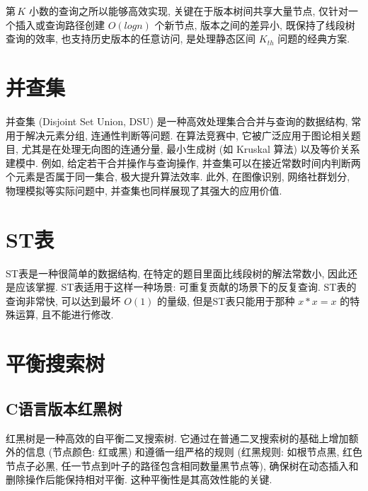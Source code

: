 \documentclass[a4paper]{ctexbook}
\begin{document}
第 $K$ 小数的查询之所以能够高效实现, 关键在于版本树间共享大量节点, 仅针对一个插入或查询路径创建 $O(log n)$ 个新节点, 版本之间的差异小, 既保持了线段树查询的效率, 也支持历史版本的任意访问, 是处理静态区间 $K_{th}$ 问题的经典方案. 



\section{并查集}

并查集 (Disjoint Set Union, DSU) 是一种高效处理集合合并与查询的数据结构, 常用于解决元素分组, 连通性判断等问题. 在算法竞赛中, 它被广泛应用于图论相关题目, 尤其是在处理无向图的连通分量, 最小生成树 (如 Kruskal 算法) 以及等价关系建模中. 例如, 给定若干合并操作与查询操作, 并查集可以在接近常数时间内判断两个元素是否属于同一集合, 极大提升算法效率. 此外, 在图像识别, 网络社群划分, 物理模拟等实际问题中, 并查集也同样展现了其强大的应用价值.



\section{ST表}

ST表是一种很简单的数据结构, 在特定的题目里面比线段树的解法常数小, 因此还是应该掌握. ST表适用于这样一种场景: 可重复贡献的场景下的反复查询. ST表的查询非常快, 可以达到最坏 $O(1)$ 的量级, 但是ST表只能用于那种 $x*x=x$ 的特殊运算, 且不能进行修改.



\section{平衡搜索树}

\subsection*{C语言版本红黑树}

红黑树是一种高效的自平衡二叉搜索树. 它通过在普通二叉搜索树的基础上增加额外的信息 (节点颜色: 红或黑) 和遵循一组严格的规则 (红黑规则: 如根节点黑, 红色节点子必黑, 任一节点到叶子的路径包含相同数量黑节点等), 确保树在动态插入和删除操作后能保持相对平衡. 这种平衡性是其高效性能的关键.
\end{document}
